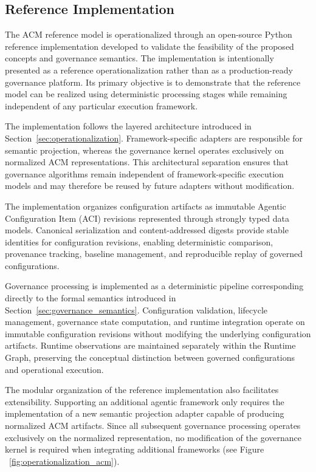 \documentclass[10pt]{article}
\begin{document}
\subsection{Reference Implementation}
\label{sec:reference_implementation}

The ACM reference model is operationalized through an open-source Python reference implementation developed to validate the feasibility of the proposed concepts and governance semantics. The implementation is intentionally presented as a reference operationalization rather than as a production-ready governance platform. Its primary objective is to demonstrate that the reference model can be realized using deterministic processing stages while remaining independent of any particular execution framework.

The implementation follows the layered architecture introduced in Section~\ref{sec:operationalization}. Framework-specific adapters are responsible for semantic projection, whereas the governance kernel operates exclusively on normalized ACM representations. This architectural separation ensures that governance algorithms remain independent of framework-specific execution models and may therefore be reused by future adapters without modification.

The implementation organizes configuration artifacts as immutable Agentic Configuration Item (ACI) revisions represented through strongly typed data models. Canonical serialization and content-addressed digests provide stable identities for configuration revisions, enabling deterministic comparison, provenance tracking, baseline management, and reproducible replay of governed configurations.

Governance processing is implemented as a deterministic pipeline corresponding directly to the formal semantics introduced in Section~\ref{sec:governance_semantics}. Configuration validation, lifecycle management, governance state computation, and runtime integration operate on immutable configuration revisions without modifying the underlying configuration artifacts. Runtime observations are maintained separately within the Runtime Graph, preserving the conceptual distinction between governed configurations and operational execution.

The modular organization of the reference implementation also facilitates extensibility. Supporting an additional agentic framework only requires the implementation of a new semantic projection adapter capable of producing normalized ACM artifacts. Since all subsequent governance processing operates exclusively on the normalized representation, no modification of the governance kernel is required when integrating additional frameworks (see Figure ~\ref{fig:operationalization_acm}).
\end{document}
